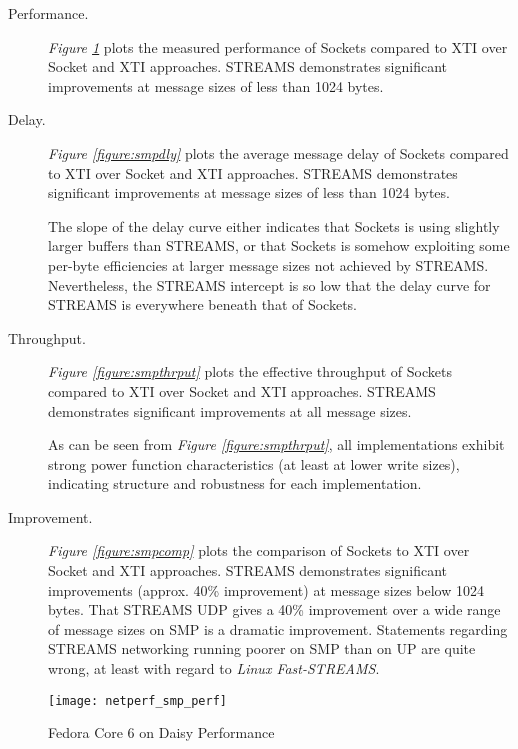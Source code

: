 \documentclass[letterpaper,final,notitlepage,twocolumn,10pt,twoside]{article}
\begin{document}
\begin{description}

\item[Performance.]

\textit{Figure \ref{figure:smpperf}}
plots the measured performance of Sockets compared to XTI over Socket and XTI approaches.  STREAMS
demonstrates significant improvements at message sizes of less than 1024 bytes.

\item[Delay.]

\textit{Figure \ref{figure:smpdly}}
plots the average message delay of Sockets compared to XTI over Socket and XTI approaches.  STREAMS
demonstrates significant improvements at message sizes of less than 1024 bytes.

The slope of the delay curve either indicates that Sockets is using slightly larger buffers than
STREAMS, or that Sockets is somehow exploiting some per-byte efficiencies at larger message sizes
not achieved by STREAMS.  Nevertheless, the STREAMS intercept is so low that the delay curve for
STREAMS is everywhere beneath that of Sockets.

\item[Throughput.]

\textit{Figure \ref{figure:smpthrput}}
plots the effective throughput of Sockets compared to XTI over Socket and XTI approaches.  STREAMS
demonstrates significant improvements at all message sizes.

As can be seen from \textit{Figure \ref{figure:smpthrput}}, all implementations exhibit strong power
function characteristics (at least at lower write sizes), indicating structure and robustness for
each implementation.

\item[Improvement.]

\textit{Figure \ref{figure:smpcomp}}
plots the comparison of Sockets to XTI over Socket and XTI approaches.  STREAMS demonstrates
significant improvements (approx. 40\% improvement) at message sizes below 1024 bytes.  That STREAMS
UDP gives a 40\% improvement over a wide range of message sizes on SMP is a dramatic improvement.
Statements regarding STREAMS networking running poorer on SMP than on UP are quite wrong, at least
with regard to \textsl{Linux Fast-STREAMS}.

\end{description}

\begin{figure}[p]
\center\texttt{[image: netperf\_smp\_perf]}
\caption[Fedora Core 6 on Daisy Performance]{Fedora Core 6 on Daisy Performance}
\label{figure:smpperf}
\end{figure}
\end{document}
